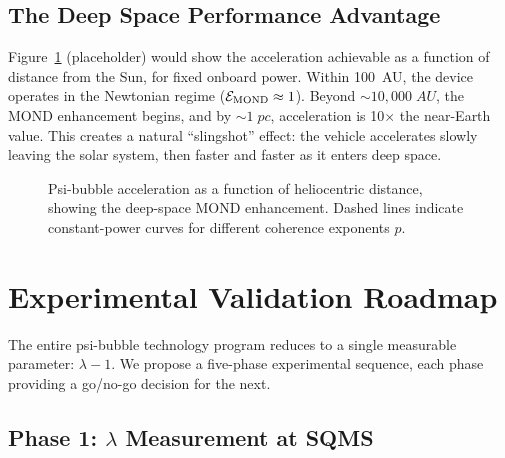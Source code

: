 \documentclass[twocolumn,prl,superscriptaddress,nofootinbib,longbibliography,floatfix]{revtex4-2}
\begin{document}
\subsection{The Deep Space Performance Advantage}

Figure~\ref{fig:accel-vs-distance} (placeholder) would show the
acceleration achievable as a function of distance from the Sun, for
fixed onboard power.  Within 100~AU, the device operates in the
Newtonian regime ($\mathcal{E}_{\rm MOND} \approx 1$).  Beyond
$\sim 10{,}000\;\si{AU}$, the MOND enhancement begins, and by
$\sim 1\;\si{pc}$, acceleration is 10$\times$ the near-Earth value.
This creates a natural ``slingshot'' effect: the vehicle accelerates
slowly leaving the solar system, then faster and faster as it enters
deep space.

\begin{figure}[h]
\centering
\caption{Psi-bubble acceleration as a function of heliocentric
distance, showing the deep-space MOND enhancement.  Dashed lines
indicate constant-power curves for different coherence exponents $p$.}
\label{fig:accel-vs-distance}
\end{figure}

\section{Experimental Validation Roadmap}\label{sec:roadmap}

The entire psi-bubble technology program reduces to a single measurable
parameter: $\lambda - 1$.  We propose a five-phase experimental
sequence, each phase providing a go/no-go decision for the next.

\subsection{Phase 1: $\lambda$ Measurement at SQMS}
\end{document}

